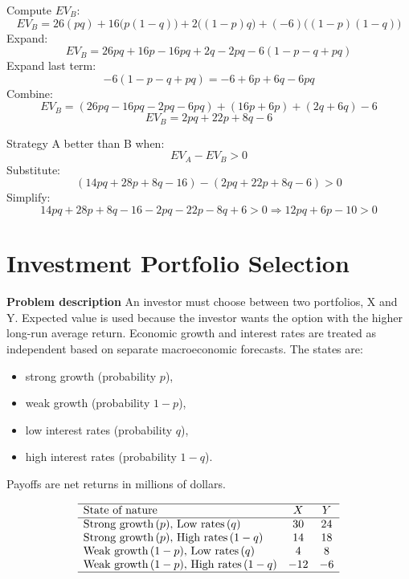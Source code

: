 \begin{ExamProblems}
		Compute \(EV_B\):
		\[
		EV_B=26(pq)+16\bigl(p(1-q)\bigr)+2\bigl((1-p)q\bigr)+(-6)\bigl((1-p)(1-q)\bigr)
		\]
		Expand:
		\[
		EV_B=26pq + 16p - 16pq + 2q - 2pq - 6(1-p-q+pq)
		\]
		Expand last term:
		\[
		-6(1-p-q+pq)=-6 + 6p + 6q - 6pq
		\]
		Combine:
		\[
		EV_B=(26pq-16pq-2pq-6pq) + (16p+6p) + (2q+6q) - 6
		\]
		\[
		EV_B=2pq + 22p + 8q - 6
		\]
		
		Strategy A better than B when:
		\[
		EV_A-EV_B>0
		\]
		Substitute:
		\[
		(14pq+28p+8q-16)-(2pq+22p+8q-6)>0
		\]
		Simplify:
		\[
		14pq+28p+8q-16-2pq-22p-8q+6>0
		\Rightarrow 12pq+6p-10>0
		\]
		
		
		\hypertarget{c7-ex10}{}
		\item
		\section{Investment Portfolio Selection}
		
		\textbf{Problem description}
		An investor must choose between two portfolios, X and Y. Expected value is used because the investor wants the option with the higher long-run average return. Economic growth and interest rates are treated as independent based on separate macroeconomic forecasts. The states are:
		\begin{itemize}
			\item strong growth (probability \(p\)),
			\item weak growth (probability \(1-p\)),
			\item low interest rates (probability \(q\)),
			\item high interest rates (probability \(1-q\)).
		\end{itemize}
		Payoffs are net returns in millions of dollars.
		
		\[
		\begin{array}{lcc}
			\hline
			\text{State of nature} & X & Y \\
			\hline
			\text{Strong growth}\,(p),\,\text{Low rates}\,(q) & 30 & 24 \\
			\text{Strong growth}\,(p),\,\text{High rates}\,(1-q) & 14 & 18 \\
			\text{Weak growth}\,(1-p),\,\text{Low rates}\,(q) & 4 & 8 \\
			\text{Weak growth}\,(1-p),\,\text{High rates}\,(1-q) & -12 & -6 \\
			\hline
		\end{array}
		\]
		

\end{ExamProblems}
